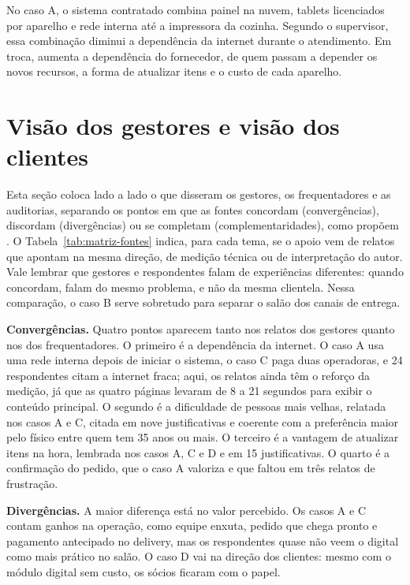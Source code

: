 No caso A, o sistema contratado combina painel na nuvem, tablets licenciados por aparelho e rede interna até a impressora da cozinha. Segundo o supervisor, essa combinação diminui a dependência da internet durante o atendimento. Em troca, aumenta a dependência do fornecedor, de quem passam a depender os novos recursos, a forma de atualizar itens e o custo de cada aparelho.

\section{Visão dos gestores e visão dos clientes}
\label{sec:disc-triangulacao}

Esta seção coloca lado a lado o que disseram os gestores, os frequentadores e as auditorias, separando os pontos em que as fontes concordam (convergências), discordam (divergências) ou se completam (complementaridades), como propõem . O Tabela~\ref{tab:matriz-fontes} indica, para cada tema, se o apoio vem de relatos que apontam na mesma direção, de medição técnica ou de interpretação do autor. Vale lembrar que gestores e respondentes falam de experiências diferentes: quando concordam, falam do mesmo problema, e não da mesma clientela. Nessa comparação, o caso B serve sobretudo para separar o salão dos canais de entrega.

\textbf{Convergências.} Quatro pontos aparecem tanto nos relatos dos gestores quanto nos dos frequentadores. O primeiro é a dependência da internet. O caso A usa uma rede interna depois de iniciar o sistema, o caso C paga duas operadoras, e 24 respondentes citam a internet fraca; aqui, os relatos ainda têm o reforço da medição, já que as quatro páginas levaram de 8 a 21 segundos para exibir o conteúdo principal. O segundo é a dificuldade de pessoas mais velhas, relatada nos casos A e C, citada em nove justificativas e coerente com a preferência maior pelo físico entre quem tem 35 anos ou mais. O terceiro é a vantagem de atualizar itens na hora, lembrada nos casos A, C e D e em 15 justificativas. O quarto é a confirmação do pedido, que o caso A valoriza e que faltou em três relatos de frustração.

\textbf{Divergências.} A maior diferença está no valor percebido. Os casos A e C contam ganhos na operação, como equipe enxuta, pedido que chega pronto e pagamento antecipado no delivery, mas os respondentes quase não veem o digital como mais prático no salão. O caso D vai na direção dos clientes: mesmo com o módulo digital sem custo, os sócios ficaram com o papel.

